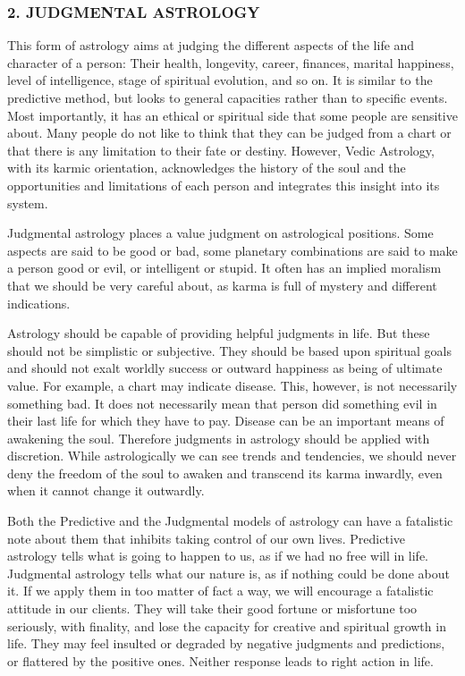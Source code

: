  

 

\subsubsection{2. JUDGMENTAL ASTROLOGY}
 

This form of astrology aims at judging the different aspects of the life and character of a person: Their health, longevity, career, finances, marital happiness, level of intelligence, stage of spiritual evolution, and so on. It is similar to the predictive method, but looks to general capacities rather than to specific events. Most importantly, it has an ethical or spiritual side that some people are sensitive about. Many people do not like to think that they can be judged from a chart or that there is any limitation to their fate or destiny. However, Vedic Astrology, with its karmic orientation, acknowledges the history of the soul and the opportunities and limitations of each person and integrates this insight into its system.

 

Judgmental astrology places a value judgment on astrological positions. Some aspects are said to be good or bad, some planetary combinations are said to make a person good or evil, or intelligent or stupid. It often has an implied moralism that we should be very careful about, as karma is full of mystery and different indications.

 

Astrology should be capable of providing helpful judgments in life. But these should not be simplistic or subjective. They should be based upon spiritual goals and should not exalt worldly success or outward happiness as being of ultimate value. For example, a chart may indicate disease. This, however, is not necessarily something bad. It does not necessarily mean that person did something evil in their last life for which they have to pay. Disease can be an important means of awakening the soul. Therefore judgments in astrology should be applied with discretion. While astrologically we can see trends and tendencies, we should never deny the freedom of the soul to awaken and transcend its karma inwardly, even when it cannot change it outwardly.

 

Both the Predictive and the Judgmental models of astrology can have a fatalistic note about them that inhibits taking control of our own lives. Predictive astrology tells what is going to happen to us, as if we had no free will in life. Judgmental astrology tells what our nature is, as if nothing could be done about it. If we apply them in too matter of fact a way, we will encourage a fatalistic attitude in our clients. They will take their good fortune or misfortune too seriously, with finality, and lose the capacity for creative and spiritual growth in life. They may feel insulted or degraded by negative judgments and predictions, or flattered by the positive ones. Neither response leads to right action in life.

